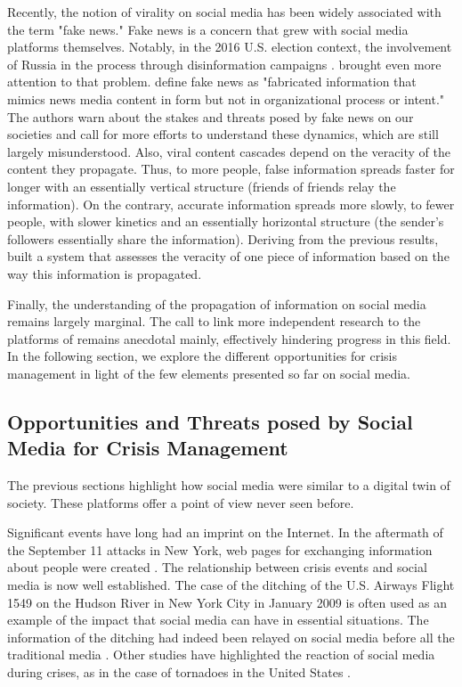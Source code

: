 Recently, the notion of virality on social media has been widely associated with the term "fake news."
Fake news is a concern that grew with social media platforms themselves.
Notably, in the 2016 U.S. election context, the involvement of Russia in the process through disinformation campaigns \parencite{u.s.senateExtremistContentRussian2017}.
brought even more attention to that problem.
\textcite{lazerScienceFakeNews2018} define fake news as "fabricated information that mimics news media content in form but not in organizational process or intent."
The authors warn about the stakes and threats posed by fake news on our societies and call for more efforts to understand these dynamics, which are still largely misunderstood.
Also, viral content cascades depend on the veracity of the content they propagate.
Thus, to more people, false information spreads faster for longer with an essentially vertical structure (friends of friends relay the information).
On the contrary, accurate information spreads more slowly, to fewer people, with slower kinetics and an essentially horizontal structure (the sender's followers essentially share the information).
Deriving from the previous results, \textcite{vosoughiRumorGaugePredicting2017} built a system that assesses the veracity of one piece of information based on the way this information is propagated.

Finally, the understanding of the propagation of information on social media remains largely marginal.
The call to link more independent research to the platforms of \textcite{lazerScienceFakeNews2018} remains anecdotal mainly, effectively hindering progress in this field.
In the following section, we explore the different opportunities for crisis management in light of the few elements presented so far on social media.

\subsection{Opportunities and Threats posed by Social Media for Crisis Management}
The previous sections highlight how social media were similar to a digital twin of society.
These platforms offer a point of view never seen before.

Significant events have long had an imprint on the Internet.
In the aftermath of the September 11 attacks in New York, web pages for exchanging information about people were created \parencite{palenCitizenCommunicationsCrisis2007}.
The relationship between crisis events and social media is now well established.
The case of the ditching of the U.S. Airways Flight 1549 on the Hudson River in New York City in January 2009 is often used as an example of the impact that social media can have in essential situations.
The information of the ditching had indeed been relayed on social media before all the traditional media \parencite{murthyTwitter2018}.
Other studies have highlighted the reaction of social media during crises, as in the case of tornadoes in the United States \parencite{justinei.blanfordTweetingTornadoes2014}.

